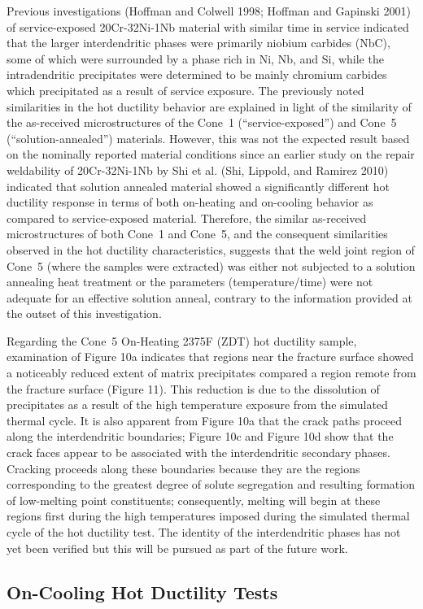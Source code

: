 Previous investigations (Hoffman and Colwell 1998; Hoffman and Gapinski 2001) of service-exposed 20Cr-32Ni-1Nb material with similar time in service indicated that the larger interdendritic phases were primarily niobium carbides (NbC), some of which were surrounded by a phase rich in Ni, Nb, and Si, while the intradendritic precipitates were determined to be mainly chromium carbides which precipitated as a result of service exposure.  The previously noted similarities in the hot ductility behavior are explained in light of the similarity of the as-received microstructures of the Cone~1 (``service-exposed'') and Cone~5 (``solution-annealed'') materials.  However, this was not the expected result based on the nominally reported material conditions since an earlier study on the repair weldability of 20Cr-32Ni-1Nb by Shi et al. (Shi, Lippold, and Ramirez 2010) indicated that solution annealed material showed a significantly different hot ductility response in terms of both on-heating and on-cooling behavior as compared to service-exposed material.  Therefore, the similar as-received microstructures of both Cone~1 and Cone~5, and the consequent similarities observed in the hot ductility characteristics, suggests that the weld joint region of Cone~5 (where the samples were extracted) was either not subjected to a solution annealing heat treatment or the parameters (temperature/time) were not adequate for an effective solution anneal, contrary to the information provided at the outset of this investigation.


Regarding the Cone~5 On-Heating 2375\textdegree{}F (ZDT) hot ductility sample, examination of Figure 10a indicates that regions near the fracture surface showed a noticeably reduced extent of matrix precipitates compared a region remote from the fracture surface  (Figure 11).  This reduction is due to the dissolution of precipitates as a result of the high temperature exposure from the simulated thermal cycle.  It is also apparent from Figure 10a that the crack paths proceed along the interdendritic boundaries; Figure 10c and Figure 10d show that the crack faces appear to be associated with the interdendritic secondary phases.  Cracking proceeds along these boundaries because they are the regions corresponding to the greatest degree of solute segregation and resulting formation of low-melting point constituents; consequently, melting will begin at these regions first during the high temperatures imposed during the simulated thermal cycle of the hot ductility test.  The identity of the interdendritic phases has not yet been verified but this will be pursued as part of the future work.

\subsection{On-Cooling Hot Ductility Tests}